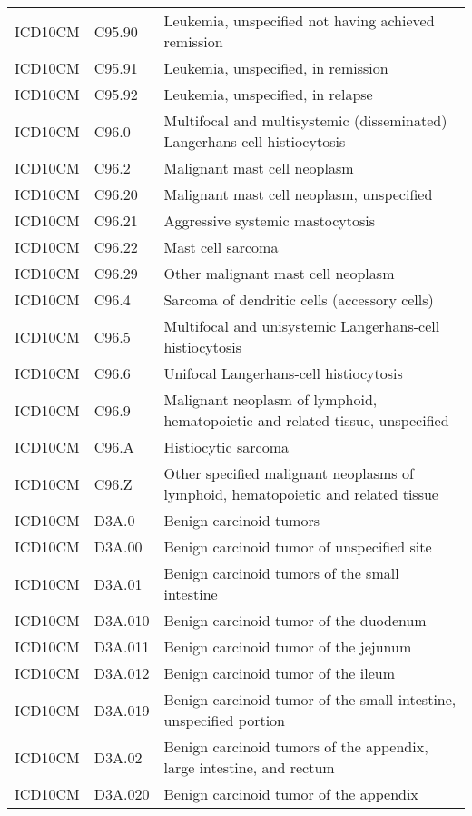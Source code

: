 \begin{longtable}{p{}p{}p{}}
  ICD10CM & C95.90 & Leukemia, unspecified not having achieved remission \\ 
  ICD10CM & C95.91 & Leukemia, unspecified, in remission \\ 
  ICD10CM & C95.92 & Leukemia, unspecified, in relapse \\ 
  ICD10CM & C96.0 & Multifocal and multisystemic (disseminated) Langerhans-cell histiocytosis \\ 
  ICD10CM & C96.2 & Malignant mast cell neoplasm \\ 
  ICD10CM & C96.20 & Malignant mast cell neoplasm, unspecified \\ 
  ICD10CM & C96.21 & Aggressive systemic mastocytosis \\ 
  ICD10CM & C96.22 & Mast cell sarcoma \\ 
  ICD10CM & C96.29 & Other malignant mast cell neoplasm \\ 
  ICD10CM & C96.4 & Sarcoma of dendritic cells (accessory cells) \\ 
  ICD10CM & C96.5 & Multifocal and unisystemic Langerhans-cell histiocytosis \\ 
  ICD10CM & C96.6 & Unifocal Langerhans-cell histiocytosis \\ 
  ICD10CM & C96.9 & Malignant neoplasm of lymphoid, hematopoietic and related tissue, unspecified \\ 
  ICD10CM & C96.A & Histiocytic sarcoma \\ 
  ICD10CM & C96.Z & Other specified malignant neoplasms of lymphoid, hematopoietic and related tissue \\ 
  ICD10CM & D3A.0 & Benign carcinoid tumors \\ 
  ICD10CM & D3A.00 & Benign carcinoid tumor of unspecified site \\ 
  ICD10CM & D3A.01 & Benign carcinoid tumors of the small intestine \\ 
  ICD10CM & D3A.010 & Benign carcinoid tumor of the duodenum \\ 
  ICD10CM & D3A.011 & Benign carcinoid tumor of the jejunum \\ 
  ICD10CM & D3A.012 & Benign carcinoid tumor of the ileum \\ 
  ICD10CM & D3A.019 & Benign carcinoid tumor of the small intestine, unspecified portion \\ 
  ICD10CM & D3A.02 & Benign carcinoid tumors of the appendix, large intestine, and rectum \\ 
  ICD10CM & D3A.020 & Benign carcinoid tumor of the appendix \\ 

\end{longtable}
